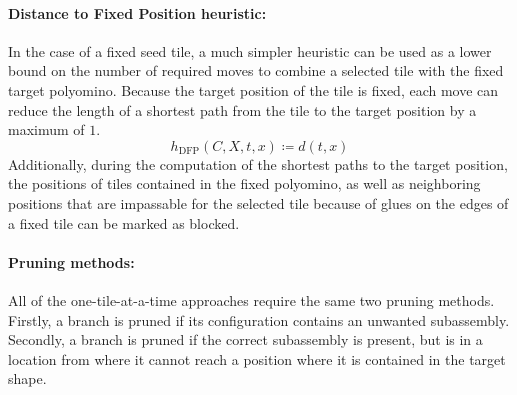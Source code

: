 \paragraph{Distance to Fixed Position heuristic:}
In the case of a fixed seed tile, a much simpler heuristic can be used as a lower bound on the number of required moves to combine a selected tile with the fixed target polyomino.
Because the target position of the tile is fixed, each move can reduce the length of a shortest path from the tile to the target position by a maximum of $1$.
\begin{equation}
h_{\text{DFP}}(C, X, t, x) \coloneqq d(t, x)
\end{equation}
Additionally, during the computation of the shortest paths to the target position, the positions of tiles contained in the fixed polyomino, as well as neighboring positions that are impassable for the selected tile because of glues on the edges of a fixed tile can be marked as blocked.

\paragraph{Pruning methods:}
All of the one-tile-at-a-time approaches require the same two pruning methods. Firstly, a branch is pruned if its configuration contains an unwanted subassembly. Secondly, a branch is pruned if the correct subassembly is present, but is in a location from where it cannot reach a position where it is contained in the target shape.

